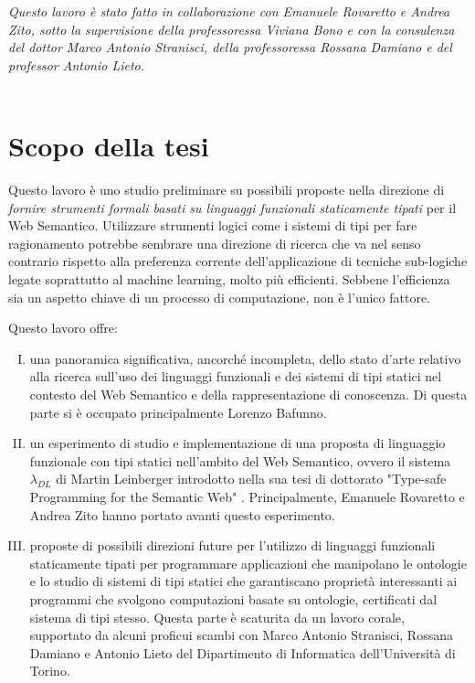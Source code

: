 \textsl{Questo lavoro è stato fatto in collaborazione con Emanuele Rovaretto e Andrea Zito, sotto la supervisione della professoressa Viviana Bono e con la consulenza del dottor Marco Antonio Stranisci, della professoressa Rossana Damiano e del professor Antonio Lieto.}\\\\


\section{Scopo della tesi}
Questo lavoro è uno studio preliminare su possibili proposte nella direzione di \textsl{fornire strumenti formali basati su linguaggi funzionali staticamente tipati} per il Web Semantico. Utilizzare strumenti logici come i sistemi di tipi per fare ragionamento potrebbe sembrare una direzione di ricerca che va nel senso contrario rispetto alla preferenza corrente dell'applicazione di tecniche sub-logiche legate soprattutto al machine learning, molto più efficienti. Sebbene l'efficienza sia un aspetto chiave di un processo di computazione, non è l'unico fattore.

Questo lavoro offre:
\begin{enumerate}[I)]
	\item una panoramica significativa, ancorché incompleta, dello stato d'arte relativo alla ricerca sull'uso dei linguaggi funzionali e dei sistemi di tipi statici nel contesto del Web Semantico e della rappresentazione di conoscenza. Di questa parte si è occupato principalmente Lorenzo Bafunno.
	\label{itm:I}
	\item  un esperimento di studio e implementazione di una proposta di linguaggio funzionale con tipi statici nell'ambito del Web Semantico, ovvero il sistema $\lambda_{DL}$ di Martin Leinberger introdotto nella sua tesi di dottorato "Type-safe Programming for the Semantic Web" \cite{leinbergerphdthesis}. Principalmente, Emanuele Rovaretto e Andrea Zito hanno portato avanti questo esperimento.
	\item proposte di possibili direzioni future per l'utilizzo di linguaggi funzionali staticamente tipati per programmare applicazioni che manipolano le ontologie e lo studio di sistemi di tipi statici che garantiscano proprietà interessanti ai programmi che svolgono computazioni basate su ontologie, certificati dal sistema di tipi stesso. Questa parte è scaturita da un lavoro corale, supportato da 
alcuni proficui scambi con Marco Antonio Stranisci, Rossana Damiano e Antonio Lieto del Dipartimento di Informatica dell'Università di Torino.	
	
\end{enumerate}
\newpage
\noindent

